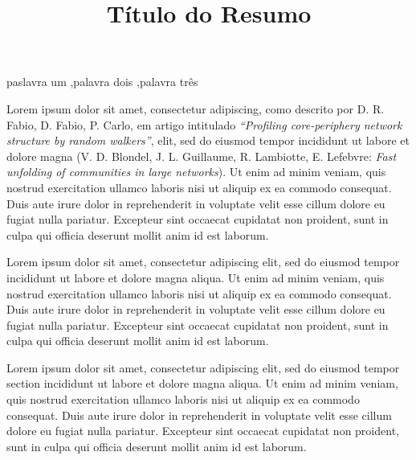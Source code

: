 \documentclass[preprint,12pt]{elsarticle}
\begin{document}
\begin{frontmatter}

\title{Título do Resumo}

\begin{keyword}
paslavra um \sep palavra dois \sep palavra três
\end{keyword}

\end{frontmatter}

\linenumbers


Lorem ipsum dolor sit amet, consectetur adipiscing, como descrito por D. R. Fabio, D. Fabio, P. Carlo, em artigo intitulado \textit{``Profiling core-periphery network structure by random walkers''},   elit, sed do eiusmod tempor incididunt ut labore et dolore magna  (V. D. Blondel, J. L. Guillaume, R. Lambiotte, E. Lefebvre: \textit{Fast unfolding of communities in large networks}). Ut enim ad minim veniam, quis nostrud exercitation ullamco laboris nisi ut aliquip ex ea commodo consequat. Duis aute irure dolor in reprehenderit in voluptate velit esse cillum dolore eu fugiat nulla pariatur. Excepteur sint occaecat cupidatat non proident, sunt in culpa qui officia deserunt mollit anim id est laborum.

Lorem ipsum dolor sit amet, consectetur adipiscing elit, sed do eiusmod tempor incididunt ut labore et dolore magna aliqua. Ut enim ad minim veniam, quis nostrud exercitation ullamco laboris nisi ut aliquip ex ea commodo consequat. Duis aute irure dolor in reprehenderit in voluptate velit esse cillum dolore eu fugiat nulla pariatur. Excepteur sint occaecat cupidatat non proident, sunt in culpa qui officia deserunt mollit anim id est laborum.

Lorem ipsum dolor sit amet, consectetur adipiscing elit, sed do eiusmod tempor section incididunt ut labore et dolore magna aliqua. Ut enim ad minim veniam, quis nostrud exercitation ullamco laboris nisi ut aliquip ex ea commodo consequat. Duis aute irure dolor in reprehenderit in voluptate velit esse cillum dolore eu fugiat nulla pariatur. Excepteur sint occaecat cupidatat non proident, sunt in culpa qui officia deserunt mollit anim id est laborum.
\end{document}
